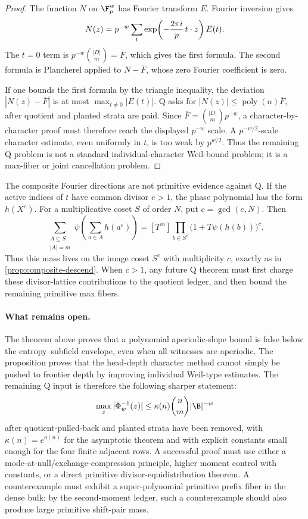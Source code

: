 \begin{proof}
The function \(N\) on \(\F_p^w\) has Fourier transform \(E\).  Fourier
inversion gives
\[
        N(z)=p^{-w}\sum_t
        \exp\!\left(-{2\pi i\over p}\,t\cdot z\right)E(t).
\]
The \(t=0\) term is \(p^{-w}\binom{|D|}{m}=\overline F\), which gives the
first formula.  The second formula is Plancherel applied to
\(N-\overline F\), whose zero Fourier coefficient is zero.

If one bounds the first formula by the triangle inequality, the deviation
\(|N(z)-\overline F|\) is at most \(\max_{t\ne0}|E(t)|\).  Q asks for
\(|N(z)|\le\operatorname{poly}(n)\overline F\), after quotient and planted
strata are paid.  Since \(\overline F=\binom{|D|}{m}p^{-w}\), a
character-by-character proof must therefore reach the displayed \(p^{-w}\)
scale.  A \(p^{-w/2}\)-scale character estimate, even uniformly in \(t\), is
too weak by \(p^{w/2}\).  Thus the remaining Q problem is not a standard
individual-character Weil-bound problem; it is a max-fiber or joint
cancellation problem.
\end{proof}

\begin{remark}
\label{rem:q-composite-audit}
The composite Fourier directions are not primitive evidence against Q.  If
the active indices of \(t\) have common divisor \(e>1\), the phase polynomial
has the form \(h(X^e)\).  For a multiplicative coset \(S\) of order \(N\),
put \(c=\gcd(e,N)\).  Then
\[
        \sum_{\substack{A\subseteq S\\ |A|=m}}
        \psi\!\left(\sum_{a\in A} h(a^e)\right)
        =
        [T^m]\prod_{b\in S^e}\bigl(1+T\psi(h(b))\bigr)^c .
\]
Thus this mass lives on the image coset \(S^e\) with multiplicity \(c\),
exactly as in \cref{prop:composite-descend}.  When \(c>1\), any future Q
theorem must first charge these divisor-lattice contributions to the quotient
ledger, and then bound the remaining primitive max fibers.
\end{remark}

\paragraph{What remains open.}
The theorem above proves that a polynomial aperiodic-slope bound is false
below the entropy--subfield envelope, even when all witnesses are aperiodic.
The proposition proves that the head-depth character method cannot simply be
pushed to frontier depth by improving individual Weil-type estimates.  The
remaining Q input is therefore the following sharper statement:
\[
        \max_z |\Phi_w^{-1}(z)|
        \le
        \kappa(n)\binom n m|\B|^{-w}
\]
after quotient-pulled-back and planted strata have been removed, with
\(\kappa(n)=e^{o(n)}\) for the asymptotic theorem and with explicit constants
small enough for the four finite adjacent rows.  A successful proof must use
either a mode-at-null/exchange-compression principle, higher moment control
with constants, or a direct primitive divisor-equidistribution theorem.  A
counterexample must exhibit a super-polynomial primitive prefix fiber in the
dense bulk; by the second-moment ledger, such a counterexample should also
produce large primitive shift-pair mass.

